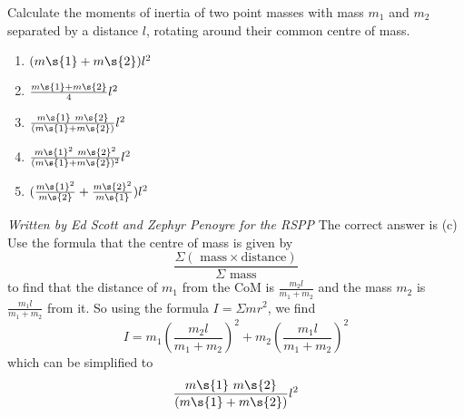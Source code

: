 \begin{problem} 
{Calculate the moments of inertia of two point masses with mass $m_1$ and $m_2$ separated by a distance $l$, rotating around their common centre of mass.
\begin{enumerate}
	\item $(m\s{1} + m\s{2})l^2$
	\item $\frac{m\s{1} + m\s{2}}{4} l^2$
	\item $\frac{m\s{1}~ m\s{2}}{(m\s{1} + m\s{2})} l^2$
	\item $\frac{m\s{1}^2~ m\s{2}^2}{(m\s{1} + m\s{2})^2} l^2$
	\item $(\frac{m\s{1}^2}{m\s{2}} + \frac{m\s{2}^2}{m\s{1}}) l^2$
\end{enumerate}}
{\textit{Written by Ed Scott and Zephyr Penoyre for the RSPP}}
{The correct answer is (c)
Use the formula that the centre of mass is given by 
\begin{equation*} \frac{\Sigma (\textrm{ mass}\times \textrm{distance})}{\Sigma \textrm{ mass}} \end{equation*}
to find that the distance of $m_1$ from the CoM is $\frac{m_2l}{m_1+m_2}$ and the mass $m_2$ is $\frac{m_1l}{m_1+m_2}$ from it. So using the formula $I=\Sigma mr^2$, we find 
\begin{equation*} I=m_1\left(\frac{m_2l}{m_1+m_2}\right)^2+m_2\left(\frac{m_1l}{m_1+m_2}\right)^2 \end{equation*}
which can be simplified to \begin{equation*}\frac{m\s{1}~ m\s{2}}{(m\s{1} + m\s{2})} l^2\end{equation*}
}
\end{problem}